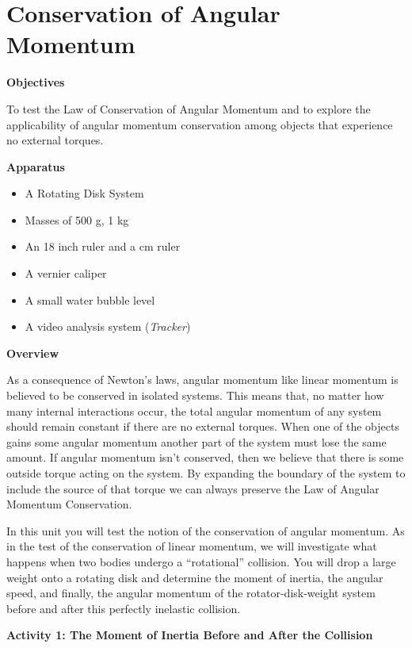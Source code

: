 
\section{Conservation of Angular Momentum}

\makelabheader %

\textbf{Objectives} 

To test the Law of Conservation of Angular Momentum and to explore the applicability
of angular momentum conservation among objects that experience no external torques. 

\textbf{Apparatus}

\begin{itemize}
\item A Rotating Disk System 
\item Masses of 500 g, 1 kg 
\item An 18 inch ruler and a cm ruler 
\item A vernier caliper
\item A small water bubble level
\item A video analysis system (\textit{Tracker})
\end{itemize}
\textbf{Overview }

As a consequence of Newton's laws, angular momentum like linear momentum is
believed to be conserved in isolated systems. This means that, no matter how
many internal interactions occur, the total angular momentum of any system should remain constant if there are no external torques. When one of the objects gains some angular momentum another part of the system must lose the same amount. If angular momentum isn't conserved, then we believe that there is some outside torque acting on the system. By expanding the boundary of the system to include the source of that torque we can always preserve the Law of Angular Momentum Conservation. 

In this unit you will test the notion of the conservation of angular momentum.
As in the test of the conservation of linear momentum, we will investigate what
happens when two bodies undergo a ``rotational'' collision.
You will drop a large weight onto a rotating disk and determine the moment of
inertia, the angular speed, and finally, the angular momentum of the rotator-disk-weight
system before and after this perfectly inelastic collision.

\textbf{Activity 1: The Moment of Inertia Before and After the Collision}

